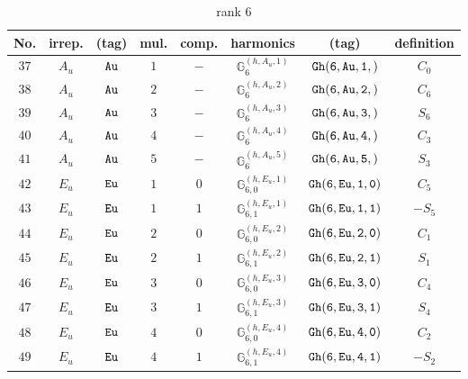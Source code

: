 \documentclass[fleqn,8pt]{jsarticle}
\begin{document}
\begin{table}[ht!]
\begin{center}
\caption{rank 6}
\renewcommand{\arraystretch}{1.3}
\begin{tabular}{cccccccc} \hline \hline
No. & irrep. & (tag) & mul. & comp. & harmonics & (tag) & definition \\ \hline
$ 37 $ & $ A_{u} $ & $ {\tt Au} $ & $ 1 $ & $ - $ & $ \mathbb{G}_{6}^{(h,A_{u},1)} $ & $ {\tt Gh(6,Au,1,)} $ & $ C_{0} $ \\
$ 38 $ & $ A_{u} $ & $ {\tt Au} $ & $ 2 $ & $ - $ & $ \mathbb{G}_{6}^{(h,A_{u},2)} $ & $ {\tt Gh(6,Au,2,)} $ & $ C_{6} $ \\
$ 39 $ & $ A_{u} $ & $ {\tt Au} $ & $ 3 $ & $ - $ & $ \mathbb{G}_{6}^{(h,A_{u},3)} $ & $ {\tt Gh(6,Au,3,)} $ & $ S_{6} $ \\
$ 40 $ & $ A_{u} $ & $ {\tt Au} $ & $ 4 $ & $ - $ & $ \mathbb{G}_{6}^{(h,A_{u},4)} $ & $ {\tt Gh(6,Au,4,)} $ & $ C_{3} $ \\
$ 41 $ & $ A_{u} $ & $ {\tt Au} $ & $ 5 $ & $ - $ & $ \mathbb{G}_{6}^{(h,A_{u},5)} $ & $ {\tt Gh(6,Au,5,)} $ & $ S_{3} $ \\
$ 42 $ & $ E_{u} $ & $ {\tt Eu} $ & $ 1 $ & $ 0 $ & $ \mathbb{G}_{6,0}^{(h,E_{u},1)} $ & $ {\tt Gh(6,Eu,1,0)} $ & $ C_{5} $ \\
$ 43 $ & $ E_{u} $ & $ {\tt Eu} $ & $ 1 $ & $ 1 $ & $ \mathbb{G}_{6,1}^{(h,E_{u},1)} $ & $ {\tt Gh(6,Eu,1,1)} $ & $ - S_{5} $ \\
$ 44 $ & $ E_{u} $ & $ {\tt Eu} $ & $ 2 $ & $ 0 $ & $ \mathbb{G}_{6,0}^{(h,E_{u},2)} $ & $ {\tt Gh(6,Eu,2,0)} $ & $ C_{1} $ \\
$ 45 $ & $ E_{u} $ & $ {\tt Eu} $ & $ 2 $ & $ 1 $ & $ \mathbb{G}_{6,1}^{(h,E_{u},2)} $ & $ {\tt Gh(6,Eu,2,1)} $ & $ S_{1} $ \\
$ 46 $ & $ E_{u} $ & $ {\tt Eu} $ & $ 3 $ & $ 0 $ & $ \mathbb{G}_{6,0}^{(h,E_{u},3)} $ & $ {\tt Gh(6,Eu,3,0)} $ & $ C_{4} $ \\
$ 47 $ & $ E_{u} $ & $ {\tt Eu} $ & $ 3 $ & $ 1 $ & $ \mathbb{G}_{6,1}^{(h,E_{u},3)} $ & $ {\tt Gh(6,Eu,3,1)} $ & $ S_{4} $ \\
$ 48 $ & $ E_{u} $ & $ {\tt Eu} $ & $ 4 $ & $ 0 $ & $ \mathbb{G}_{6,0}^{(h,E_{u},4)} $ & $ {\tt Gh(6,Eu,4,0)} $ & $ C_{2} $ \\
$ 49 $ & $ E_{u} $ & $ {\tt Eu} $ & $ 4 $ & $ 1 $ & $ \mathbb{G}_{6,1}^{(h,E_{u},4)} $ & $ {\tt Gh(6,Eu,4,1)} $ & $ - S_{2} $ \\
 \hline \hline
\end{tabular}
\end{center}
\end{table}
\end{document}
